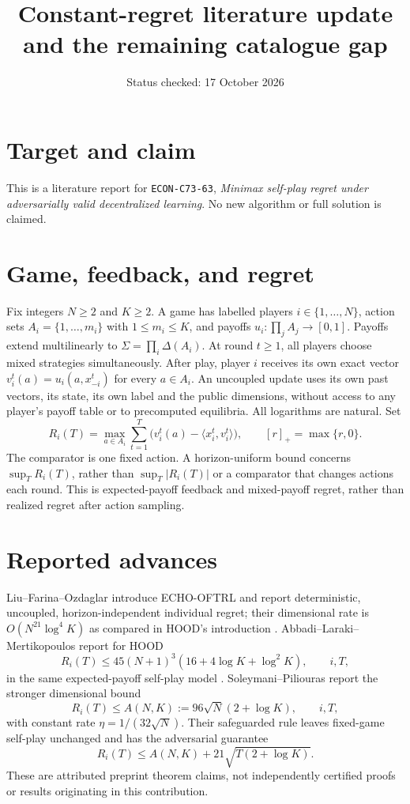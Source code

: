 \documentclass[11pt]{article}
\title{Constant-regret literature update and the remaining catalogue gap}
\author{}
\date{Status checked: 17 October 2026}
\begin{document}
\maketitle
\section*{Target and claim}
This is a literature report for \texttt{ECON-C73-63},
\emph{Minimax self-play regret under adversarially valid decentralized
learning}. No new algorithm or full solution is claimed.
\section*{Game, feedback, and regret}
Fix integers $N\geq 2$ and $K\geq 2$. A game has labelled players
$i\in\{1,\ldots,N\}$, action sets $A_i=\{1,\ldots,m_i\}$ with
$1\leq m_i\leq K$, and payoffs $u_i:\prod_j A_j\to[0,1]$.
Payoffs extend multilinearly to $\Sigma=\prod_i\Delta(A_i)$.
At round $t\geq1$, all players choose mixed strategies simultaneously.
After play, player $i$ receives its own exact vector
$v_i^t(a)=u_i(a,x_{-i}^t)$ for every $a\in A_i$.
An uncoupled update uses its own past vectors, its state, its own label and
the public dimensions, without access to any player's payoff table or to
precomputed equilibria. All logarithms are natural. Set
\[
 R_i(T)=\max_{a\in A_i}\sum_{t=1}^T
  \bigl(v_i^t(a)-\langle x_i^t,v_i^t\rangle\bigr),
 \qquad [r]_+=\max\{r,0\}.
\]
The comparator is one fixed action. A horizon-uniform bound concerns
$\sup_T R_i(T)$, rather than $\sup_T|R_i(T)|$ or a comparator that changes
actions each round. This is expected-payoff feedback and mixed-payoff
regret, rather than realized regret after action sampling.

\section*{Reported advances}
Liu--Farina--Ozdaglar introduce ECHO-OFTRL and report deterministic,
uncoupled, horizon-independent individual regret; their dimensional
rate is $O(N^{21}\log^4K)$ as compared in HOOD's introduction
\cite{echo,hood}. Abbadi--Laraki--Mertikopoulos report for HOOD
\[
 R_i(T)\leq45(N+1)^3(16+4\log K+\log^2K),\qquad i,T,
\]
in the same expected-payoff self-play model \cite{hood}.
Soleymani--Piliouras report the stronger dimensional bound
\cite[Theorem 4.10]{morm}
\[
 R_i(T)\leq A(N,K):=96\sqrt N(2+\log K),\qquad i,T,
\]
with constant rate $\eta=1/(32\sqrt N)$. Their safeguarded rule leaves
fixed-game self-play unchanged and has the adversarial guarantee
\[
 R_i(T)\leq A(N,K)+21\sqrt{T(2+\log K)}.
\]
These are attributed preprint theorem claims, not independently
certified proofs or results originating in this contribution.
\end{document}
